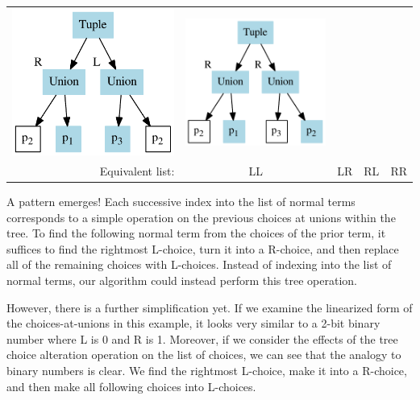 \documentclass[a4paper,english]{lipics-v2019}
\begin{document}
\begin{tabular}{r|c|c|c|c}
\includegraphics[scale=0.35]{figures-gen/exmp2c.pdf} &
\includegraphics[scale=0.35]{figures-gen/exmp2d.pdf} \\
Equivalent list:&LL&LR&RL&RR
\end{tabular}

A pattern emerges! Each successive index into the list of
normal terms corresponds to a simple operation on the previous
choices at unions within the tree. To find the following normal 
term from the choices of the prior term, it suffices to find the
rightmost L-choice, turn it into a R-choice, and then replace all
of the remaining choices with L-choices. Instead of indexing into
the list of normal terms, our algorithm could instead perform this
tree operation.

However, there is a further simplification yet. If we examine the  linearized
form of the choices-at-unions in this example, it looks very similar to a
2-bit binary number where L is 0 and R is 1. Moreover, if we consider the
effects of the tree choice alteration operation on the list of choices, we can
see that the analogy to binary numbers is clear. We find the rightmost
L-choice, make it into a R-choice, and then make all following choices into
L-choices.
\end{document}
